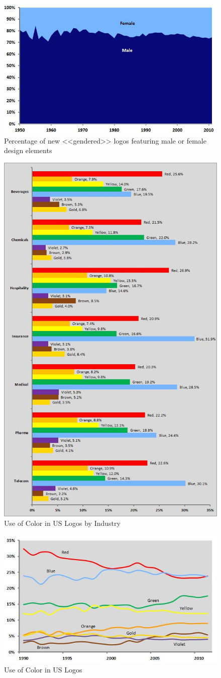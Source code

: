 \begin{figure}[ht]
  \centering
  \includegraphics[width=.5\linewidth]{images/supplement/emblemetrics/malefemale}
  \caption{Percentage of new <<gendered>> logos featuring male or female design elements}
  \label{fig:emblemetrics:male-female}
\end{figure}

\begin{figure}[ht]
  \centering
  \includegraphics[width=.5\linewidth]{images/supplement/emblemetrics/colorindustry}
  \caption{Use of Color in US Logos by Industry}
  \label{fig:emblemetrics:color-industry}
\end{figure}

\begin{figure}[ht]
  \centering
  \includegraphics[width=.5\linewidth]{images/supplement/emblemetrics/color}
  \caption{Use of Color in US Logos}
  \label{fig:emblemetrics:color}
\end{figure}

